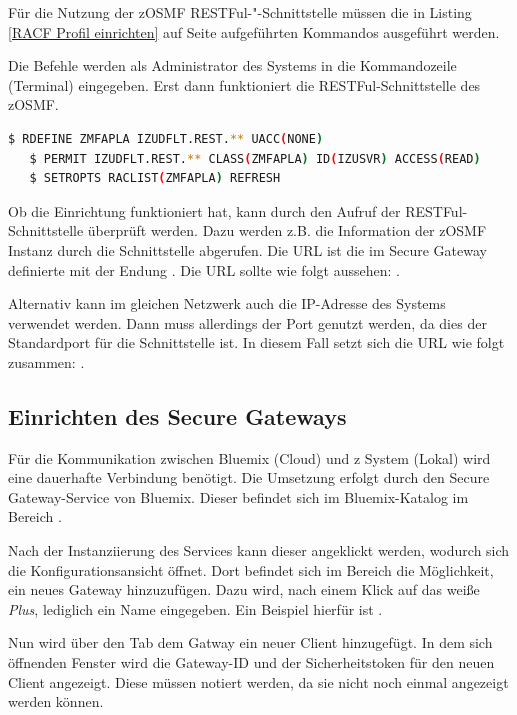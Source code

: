 Für die Nutzung der zOSMF RESTFul-"-Schnittstelle müssen die in Listing \ref{RACF Profil einrichten} auf Seite
\pageref{RACF Profil einrichten} aufgeführten Kommandos ausgeführt werden.

Die Befehle werden als Administrator des Systems in die Kommandozeile (Terminal) eingegeben. Erst dann funktioniert die
RESTFul-Schnittstelle des zOSMF.

\begin{lstlisting}[language=bash, caption=RACF Profil einrichten, label=RACF Profil einrichten]
   $ RDEFINE ZMFAPLA IZUDFLT.REST.** UACC(NONE)
   $ PERMIT IZUDFLT.REST.** CLASS(ZMFAPLA) ID(IZUSVR) ACCESS(READ)
   $ SETROPTS RACLIST(ZMFAPLA) REFRESH
\end{lstlisting}

Ob die Einrichtung funktioniert hat, kann durch den Aufruf der RESTFul-Schnittstelle überprüft werden. Dazu werden z.B.
die Information der zOSMF Instanz durch die Schnittstelle abgerufen. Die URL ist die im Secure Gateway definierte mit der
Endung . Die URL sollte wie folgt aussehen: .

Alternativ kann im gleichen Netzwerk auch die IP-Adresse des Systems verwendet werden. Dann muss allerdings der Port
 genutzt werden, da dies der Standardport für die Schnittstelle ist. In diesem Fall setzt sich die URL wie
folgt zusammen: .

\subsection{Einrichten des Secure Gateways}
\label{subsection:secureGateway}
Für die Kommunikation zwischen Bluemix (Cloud) und z System (Lokal) wird eine dauerhafte Verbindung benötigt. Die Umsetzung
erfolgt durch den Secure Gateway-Service von Bluemix. Dieser befindet sich im Bluemix-Katalog im Bereich .

Nach der Instanziierung des Services kann dieser angeklickt werden, wodurch sich die Konfigurationsansicht öffnet. Dort
befindet sich im Bereich  die Möglichkeit, ein neues Gateway hinzuzufügen. Dazu wird, nach einem Klick auf
das weiße \textit{Plus}, lediglich ein Name eingegeben. Ein Beispiel hierfür ist .

Nun wird über den Tab  dem Gatway ein neuer Client hinzugefügt. In dem sich öffnenden Fenster wird die
Gateway-ID und der Sicherheitstoken für den neuen Client angezeigt. Diese müssen notiert werden, da sie nicht noch einmal
angezeigt werden können.


